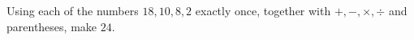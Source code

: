 Using each of the numbers $18,10,8,2$ exactly once, together with $+,-,\times,\div$ and parentheses, make $24$.
